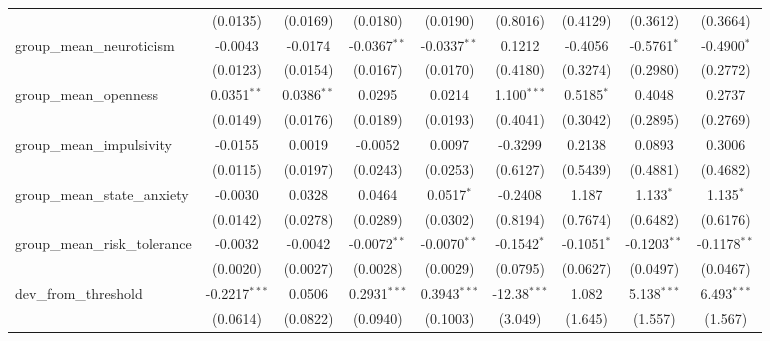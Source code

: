 \begin{tabular}{lcccccccc}
                                    & (0.0135)        & (0.0169)        & (0.0180)        & (0.0190)        & (0.8016)       & (0.4129)       & (0.3612)       & (0.3664)\\   
   group\_mean\_neuroticism         & -0.0043         & -0.0174         & -0.0367$^{**}$  & -0.0337$^{**}$  & 0.1212         & -0.4056        & -0.5761$^{*}$  & -0.4900$^{*}$\\   
                                    & (0.0123)        & (0.0154)        & (0.0167)        & (0.0170)        & (0.4180)       & (0.3274)       & (0.2980)       & (0.2772)\\   
   group\_mean\_openness            & 0.0351$^{**}$   & 0.0386$^{**}$   & 0.0295          & 0.0214          & 1.100$^{***}$  & 0.5185$^{*}$   & 0.4048         & 0.2737\\   
                                    & (0.0149)        & (0.0176)        & (0.0189)        & (0.0193)        & (0.4041)       & (0.3042)       & (0.2895)       & (0.2769)\\   
   group\_mean\_impulsivity         & -0.0155         & 0.0019          & -0.0052         & 0.0097          & -0.3299        & 0.2138         & 0.0893         & 0.3006\\   
                                    & (0.0115)        & (0.0197)        & (0.0243)        & (0.0253)        & (0.6127)       & (0.5439)       & (0.4881)       & (0.4682)\\   
   group\_mean\_state\_anxiety      & -0.0030         & 0.0328          & 0.0464          & 0.0517$^{*}$    & -0.2408        & 1.187          & 1.133$^{*}$    & 1.135$^{*}$\\   
                                    & (0.0142)        & (0.0278)        & (0.0289)        & (0.0302)        & (0.8194)       & (0.7674)       & (0.6482)       & (0.6176)\\   
   group\_mean\_risk\_tolerance     & -0.0032         & -0.0042         & -0.0072$^{**}$  & -0.0070$^{**}$  & -0.1542$^{*}$  & -0.1051$^{*}$  & -0.1203$^{**}$ & -0.1178$^{**}$\\   
                                    & (0.0020)        & (0.0027)        & (0.0028)        & (0.0029)        & (0.0795)       & (0.0627)       & (0.0497)       & (0.0467)\\   
   dev\_from\_threshold             & -0.2217$^{***}$ & 0.0506          & 0.2931$^{***}$  & 0.3943$^{***}$  & -12.38$^{***}$ & 1.082          & 5.138$^{***}$  & 6.493$^{***}$\\   
                                    & (0.0614)        & (0.0822)        & (0.0940)        & (0.1003)        & (3.049)        & (1.645)        & (1.557)        & (1.567)\\   

\end{tabular}
